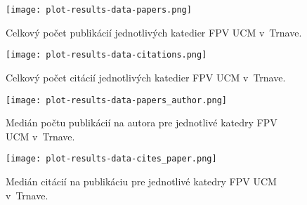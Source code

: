 \begin{figure}
  \centering
  \texttt{[image: plot-results-data-papers.png]}
  \caption[Celkový počet publikácií jednotlivých katedier FPV UCM v~Trnave]%
  {Celkový počet publikácií jednotlivých katedier FPV UCM v~Trnave.}
  \label{fig:publications.plot}
\end{figure}

\begin{figure}
  \centering
  \texttt{[image: plot-results-data-citations.png]}
  \caption[Celkový počet citácií jednotlivých katedier FPV UCM v~Trnave]%
  {Celkový počet citácií jednotlivých katedier FPV UCM v~Trnave.}
  \label{fig:citations.plot}
\end{figure}

\begin{figure}
  \centering
  \texttt{[image: plot-results-data-papers\_author.png]}
  \caption[Medián počtu publikácií na autora pre jednotlivé katedry FPV UCM v~Trnave]%
  {Medián počtu publikácií na autora pre jednotlivé katedry FPV UCM v~Trnave.}
  \label{fig:p/a.plot}
\end{figure}


\begin{figure}
  \centering
  \texttt{[image: plot-results-data-cites\_paper.png]}
  \caption[Medián citácií na publikáciu pre jednotlivé katedry FPV UCM v~Trnave]%
  {Medián citácií na publikáciu pre jednotlivé katedry FPV UCM v~Trnave.}
  \label{fig:c/p.plot}
\end{figure}

